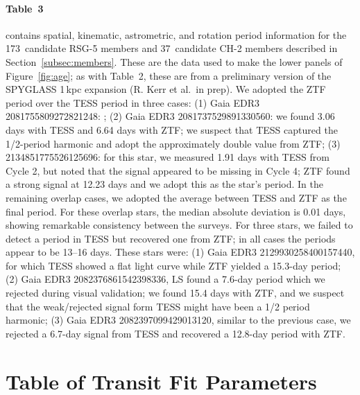 \documentclass[12pt,twocolumn,tighten,linenumbers,trackchanges]{aastex63}
\newcommand{\nchtwo}{37} %
\newcommand{\nrsgfive}{173} %
\begin{document}
\paragraph{Table~3} contains spatial, kinematic, astrometric, and
rotation period information for the \nrsgfive\ candidate RSG-5 members
and \nchtwo\ candidate CH-2 members described in
Section~\ref{subsec:members}.  These are the data used to make the
lower panels of Figure~\ref{fig:age}; as with Table~2, these are
from a preliminary version of the SPYGLASS 1\,kpc expansion (R. Kerr et
al.\ in prep). 
We adopted the ZTF period over the
TESS period in three cases: (1) Gaia EDR3 2081755809272821248: ; (2) Gaia EDR3 2081737529891330560: we found 3.06
days with TESS and 6.64 days with ZTF; we suspect that TESS captured
the 1/2-period harmonic and adopt the approximately double value from
ZTF; (3) 2134851775526125696: for this star, we measured 1.91 days
with TESS from Cycle 2, but noted that the signal appeared to be
missing in Cycle 4; ZTF found a strong signal at 12.23 days and we
adopt this as the star's period. In the remaining overlap cases, we
adopted the average between TESS and ZTF as the final period. For
these overlap stars, the median absolute deviation is 0.01 days,
showing remarkable consistency between the surveys. For three stars,
we failed to detect a period in TESS but recovered one from ZTF; in
all cases the periods appear to be 13--16 days.  These stars were: (1)
Gaia EDR3 2129930258400157440, for which TESS showed a flat light
curve while ZTF yielded a 15.3-day period; (2) Gaia EDR3
2082376861542398336, LS found a 7.6-day period which we rejected
during visual validation; we found 15.4 days with ZTF, and we suspect
that the weak/rejected signal form TESS might have been a 1/2 period
harmonic; (3) Gaia EDR3 2082397099429013120, similar to the previous
case, we rejected a 6.7-day signal from TESS and recovered a 12.8-day
period with ZTF. 


\section{Table of Transit Fit Parameters}
\label{app:transit}
\end{document}
